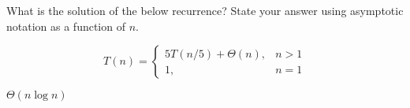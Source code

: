 \begin{prob}
    What is the solution of the below recurrence? State your answer using asymptotic notation as a function of $n$.

    \[
        T(n) = 
        \begin{cases}
            5 T(n/5) + \Theta(n),& n > 1\\
            1,& n = 1
        \end{cases}
    \]

    \begin{soln}
        $\Theta(n \log n)$
    \end{soln}

\end{prob}

